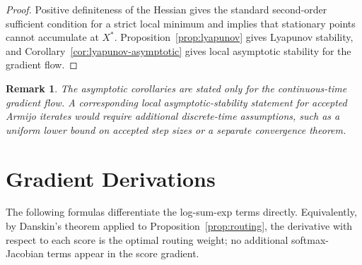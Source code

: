 \documentclass[11pt,a4paper]{article}
\newtheorem{remark}{Remark}
\begin{document}
\begin{proof}
Positive definiteness of the Hessian gives the standard second-order
sufficient condition for a strict local minimum and implies that stationary
points cannot accumulate at $X^*$. Proposition~\ref{prop:lyapunov} gives
Lyapunov stability, and Corollary~\ref{cor:lyapunov-asymptotic} gives local
asymptotic stability for the gradient flow.
\end{proof}

\begin{remark}
The asymptotic corollaries are stated only for the continuous-time gradient
flow. A corresponding local asymptotic-stability statement for accepted
Armijo iterates would require additional discrete-time assumptions, such as a
uniform lower bound on accepted step sizes or a separate convergence theorem.
\end{remark}

\section{Gradient Derivations}
\label{app:gradients}

The following formulas differentiate the log-sum-exp terms directly. Equivalently,
by Danskin's theorem applied to Proposition~\ref{prop:routing}, the derivative
with respect to each score is the optimal routing weight; no additional
softmax-Jacobian terms appear in the score gradient.
\end{document}
